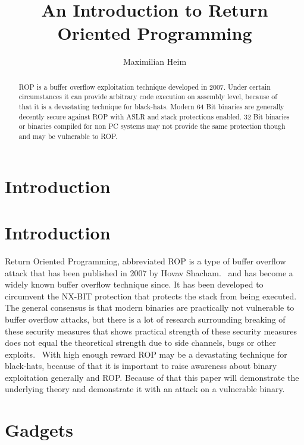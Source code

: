 \documentclass[journal=tosc,submission, notanonymous]{iacrtrans}
\author{Maximilian Heim\inst{1}}
\institute{
  University Albstadt-Sigmaringen, Albstadt, Germany, \email{MaximilianHeim@protonmail.com}
}
\title{An Introduction to Return Oriented Programming}
\begin{document}
\maketitle




\begin{abstract}
ROP is a buffer overflow exploitation technique developed in 2007. Under certain circumstances it can provide arbitrary code execution on assembly level, because of that it is a devastating technique for black-hats. Modern 64 Bit binaries are generally decently secure against ROP with ASLR and stack protections enabled. 32 Bit binaries or binaries compiled for non PC systems may not provide the same protection though and may be vulnerable to ROP. 
\end{abstract}

\section{Introduction}

\section{Introduction}
Return Oriented Programming, abbreviated ROP is a type of buffer overflow attack that has been published in 2007 by Hovav Shacham.~\cite{ropfirstpaper} and has become a widely known buffer overflow technique since. It has been developed to circumvent the NX-BIT protection that protects the stack from being executed. The general consensus is that modern binaries are practically not vulnerable to buffer overflow attacks, but there is a lot of research surrounding breaking of these security measures that shows practical strength of these security measures does not equal the theoretical strength due to side channels, bugs or other exploits.~\cite{aslr} With high enough reward ROP may be a devastating technique for black-hats, because of that it is important to raise awareness about binary exploitation generally and ROP. Because of that this paper will demonstrate the underlying theory and demonstrate it with an attack on a vulnerable binary.


\section{Gadgets}
\label{sec:gadgets}
\end{document}
